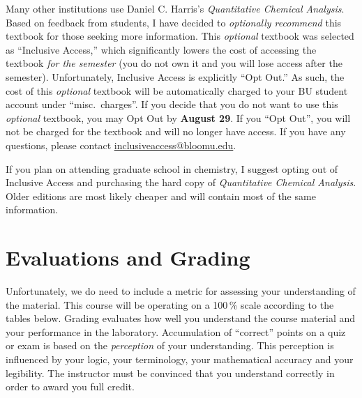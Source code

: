 \documentclass[11pt,letterpaper]{article}
\begin{document}
Many other institutions use Daniel C. Harris's \textit{Quantitative Chemical
Analysis}. Based on feedback from students, I have decided to \emph{optionally
recommend} this textbook for those seeking more information. 
This \emph{optional} textbook was selected as ``Inclusive Access,'' which
significantly lowers the cost of accessing the textbook \emph{for the semester}
(you do not own it and you will lose access after the semester). Unfortunately,
Inclusive Access is explicitly ``Opt Out.'' As such, the cost of this
\emph{optional} textbook will be automatically charged to your BU student
account under “misc.\ charges”.  If you decide that you do not want to use this
\emph{optional} textbook, you may Opt Out by \textbf{August 29}.  If you ``Opt
Out'', you will not be charged for the textbook and will no longer have access.
If you have any questions, please contact
\href{mailto:inclusiveaccess@bloomu.edu}{inclusiveaccess@bloomu.edu}.

If you plan on attending graduate school in chemistry, I suggest opting out of
Inclusive Access and purchasing the
hard copy of \textit{Quantitative Chemical Analysis}. Older editions are most
likely cheaper and will contain most of the same information.

\section{Evaluations and Grading}
Unfortunately, we do need to include a metric for assessing your understanding
of the material. This course will be operating on a 100\,\% scale according to
the tables below. Grading evaluates how well you understand the course material
and your performance in the laboratory.  Accumulation of ``correct'' points on a
quiz or exam is based on the \emph{perception} of your understanding. This
perception is influenced by your logic, your terminology, your mathematical
accuracy and your legibility. The instructor must be convinced that you
understand correctly in order to award you full credit.
\end{document}
